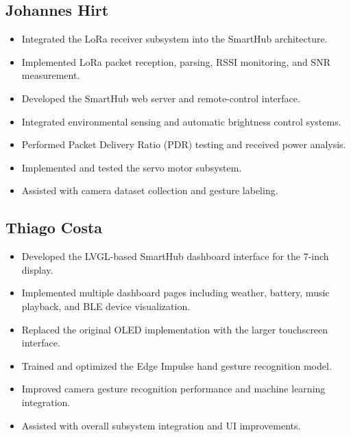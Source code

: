 \documentclass[11pt,letterpaper]{article}
\begin{document}
\subsection{Johannes Hirt}
\begin{itemize}[leftmargin=*]
    \item Integrated the LoRa receiver subsystem into the SmartHub
          architecture.
    \item Implemented LoRa packet reception, parsing, RSSI monitoring,
          and SNR measurement.
    \item Developed the SmartHub web server and remote-control
          interface.
    \item Integrated environmental sensing and automatic brightness
          control systems.
    \item Performed Packet Delivery Ratio (PDR) testing and received
          power analysis.
    \item Implemented and tested the servo motor subsystem.
    \item Assisted with camera dataset collection and gesture
          labeling.
\end{itemize}

\subsection{Thiago Costa}
\begin{itemize}[leftmargin=*]
    \item Developed the LVGL-based SmartHub dashboard interface for
          the 7-inch display.
    \item Implemented multiple dashboard pages including weather,
          battery, music playback, and BLE device visualization.
    \item Replaced the original OLED implementation with the larger
          touchscreen interface.
    \item Trained and optimized the Edge Impulse hand gesture
          recognition model.
    \item Improved camera gesture recognition performance and machine
          learning integration.
    \item Assisted with overall subsystem integration and UI
          improvements.
\end{itemize}
\end{document}
